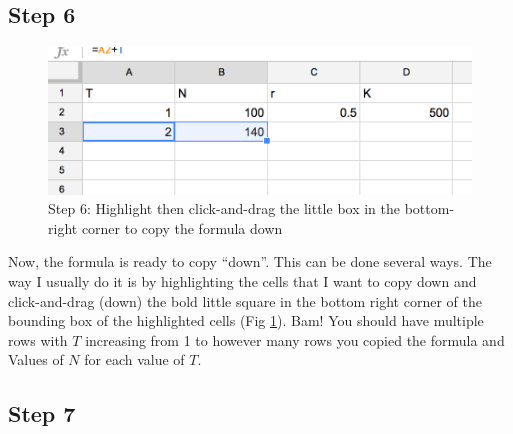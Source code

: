 \documentclass[]{book}
\begin{document}
\subsection{Step 6}\label{step-6}

\begin{figure}

{\centering \includegraphics[width=0.8\linewidth]{images/logistic6} 

}

\caption{Step 6: Highlight then click-and-drag the little box in the bottom-right corner to copy the formula down}\label{fig:cancer-fig6}
\end{figure}

Now, the formula is ready to copy ``down''. This can be done several
ways. The way I usually do it is by highlighting the cells that I want
to copy down and click-and-drag (down) the bold little square in the
bottom right corner of the bounding box of the highlighted cells (Fig
\ref{fig:cancer-fig6}). Bam! You should have multiple rows with \(T\)
increasing from 1 to however many rows you copied the formula and Values
of \(N\) for each value of \(T\).

\subsection{Step 7}\label{step-7}
\end{document}
